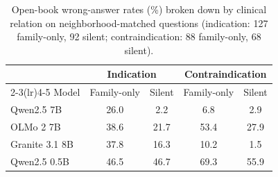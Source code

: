 \begin{table}[ht]
\centering
\small
\setlength{\tabcolsep}{3pt}
\begin{tabular}{lcccc}
\toprule
 & \multicolumn{2}{c}{Indication} & \multicolumn{2}{c}{Contraindication} \\
\cmidrule(lr){2-3}\cmidrule(lr){4-5}
Model & Family-only & Silent & Family-only & Silent \\
\midrule
Qwen2.5 7B & 26.0 & 2.2 & 6.8 & 2.9 \\
OLMo 2 7B & 38.6 & 21.7 & 53.4 & 27.9 \\
Granite 3.1 8B & 37.8 & 16.3 & 10.2 & 1.5 \\
Qwen2.5 0.5B & 46.5 & 46.7 & 69.3 & 55.9 \\
\bottomrule
\end{tabular}
\caption{Open-book wrong-answer rates (\%) broken down by clinical relation on neighborhood-matched questions (indication: 127 family-only, 92 silent; contraindication: 88 family-only, 68 silent).}
\label{tab:byrel}
\end{table}